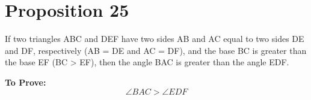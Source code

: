 
\section*{Proposition 25}

\begin{thm}
If two triangles ABC and DEF have two sides AB and AC equal to two sides DE and DF, respectively (AB = DE and AC = DF), and the base BC is greater than the base EF (BC > EF), then the angle BAC is greater than the angle EDF.
\end{thm}

\begin{figure}[H]
	\begin{subfigure}{0.35\textwidth}
		\caption{}
	\end{subfigure}
	\begin{subfigure}{0.35\textwidth}
		\caption{}
	\end{subfigure}
	\caption{}
\end{figure}

\textbf{To Prove:} 
\[\angle{BAC} > \angle{EDF}\]

